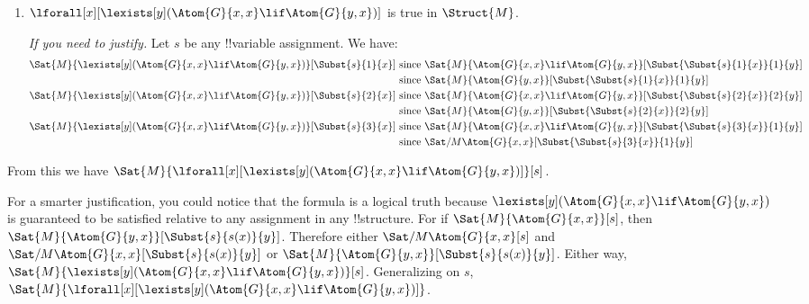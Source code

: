 \documentclass[../../../include/open-logic-section]{subfiles}
\begin{document}
\begin{prob}
\begin{ans}
\begin{enumerate}
    \item $\lforall[x][\lexists[y](\Atom{G}{x,x}\lif \Atom{G}{y,x})]$ is true in
    $\Struct{M}$. 

    \emph{If you need to justify.} Let $s$ be any !!{variable} 
        assignment. We have: 
        \begin{align*}
        \Sat{M}{\lexists[y](\Atom{G}{x,x}\lif \Atom{G}{y,x})}[\Subst{s}{1}{x}]
             & \text{ since }\Sat{M}{\Atom{G}{x,x}\lif \Atom{G}{y,x}}[\Subst{\Subst{s}{1}{x}}{1}{y}]
        \\
             & \text{ since }\Sat{M}{\Atom{G}{y,x}}[\Subst{\Subst{s}{1}{x}}{1}{y}]
        \\
        \Sat{M}{\lexists[y](\Atom{G}{x,x}\lif \Atom{G}{y,x})}[\Subst{s}{2}{x}]
             & \text{ since }\Sat{M}{\Atom{G}{x,x}\lif \Atom{G}{y,x}}[\Subst{\Subst{s}{2}{x}}{2}{y}]
        \\
             & \text{ since }\Sat{M}{\Atom{G}{y,x}}[\Subst{\Subst{s}{2}{x}}{2}{y}]
        \\
        \Sat{M}{\lexists[y](\Atom{G}{x,x}\lif \Atom{G}{y,x})}[\Subst{s}{3}{x}]
             & \text{ since }\Sat{M}{\Atom{G}{x,x}\lif \Atom{G}{y,x}}[\Subst{\Subst{s}{3}{x}}{1}{y}]
        \\
             & \text{ since }\Sat/{M}{\Atom{G}{x,x}}[\Subst{\Subst{s}{3}{x}}{1}{y}]
        \end{align*}
    \end{enumerate}
    From this we have $\Sat{M}{\lforall[x][\lexists[y](\Atom{G}{x,x}\lif \Atom{G}{y,x})]}[s]$. 

    For a smarter justification, you could notice that the formula is
    a logical truth because $\lexists[y](\Atom{G}{x,x}\lif \Atom{G}{y,x})$ is
    guaranteed to be satisfied relative to any assignment in any
    !!{structure}. For if $\Sat{M}{\Atom{G}{x,x}}[s]$, then
    $\Sat{M}{\Atom{G}{y,x}}[\Subst{s}{s(x)}{y}]$. Therefore either
    $\Sat/{M}{\Atom{G}{x,x}}[s]$ and
    $\Sat/{M}{\Atom{G}{x,x}}[\Subst{s}{s(x)}{y}]$ or
    $\Sat{M}{\Atom{G}{y,x}}[\Subst{s}{s(x)}{y}]$. Either way, 
    $\Sat{M}{\lexists[y](\Atom{G}{x,x}\lif \Atom{G}{y,x})}[s]$.
    Generalizing on $s$, $\Sat{M}{\lforall[x][\lexists[y](\Atom{G}{x,x}\lif \Atom{G}{y,x})]}$.

    \clearpage
    \end{ans}

\end{prob}
\end{document}
